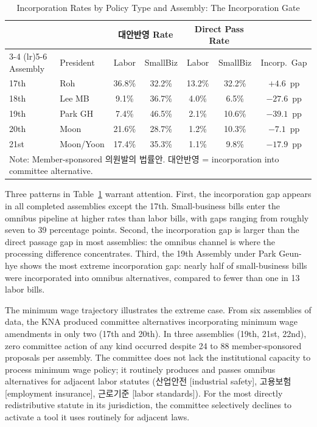 \documentclass[11pt]{article}
\begin{document}
\begin{table}[H]
\centering
\caption{Incorporation Rates by Policy Type and Assembly: The Incorporation Gate}
\label{tab:incorp}
\begin{tabular}{llccccc}
\toprule
 & & \multicolumn{2}{c}{대안반영 Rate} & \multicolumn{2}{c}{Direct Pass Rate} & \\
\cmidrule(lr){3-4} \cmidrule(lr){5-6}
Assembly & President & Labor & SmallBiz & Labor & SmallBiz & Incorp.\ Gap \\
\midrule
17th & Roh             & 36.8\% & 32.2\% & 13.2\% & 32.2\% & $+4.6$~pp \\
18th & Lee MB          & 9.1\%  & 36.7\% & 4.0\%  & 6.5\%  & $-27.6$~pp \\
19th & Park GH         & 7.4\%  & 46.5\% & 2.1\%  & 10.6\% & $-39.1$~pp \\
20th & Moon            & 21.6\% & 28.7\% & 1.2\%  & 10.3\% & $-7.1$~pp \\
21st & Moon/Yoon       & 17.4\% & 35.3\% & 1.1\%  & 9.8\%  & $-17.9$~pp \\
\bottomrule
\multicolumn{7}{l}{\footnotesize Note: Member-sponsored 의원발의 법률안. 대안반영 = incorporation into committee alternative.} \\
\end{tabular}
\end{table}

Three patterns in Table~\ref{tab:incorp} warrant attention. First, the incorporation gap appears in all completed assemblies except the 17th. Small-business bills enter the omnibus pipeline at higher rates than labor bills, with gaps ranging from roughly seven to 39 percentage points. Second, the incorporation gap is larger than the direct passage gap in most assemblies: the omnibus channel is where the processing difference concentrates. Third, the 19th Assembly under Park Geun-hye shows the most extreme incorporation gap: nearly half of small-business bills were incorporated into omnibus alternatives, compared to fewer than one in 13 labor bills.

The minimum wage trajectory illustrates the extreme case. From six assemblies of data, the KNA produced committee alternatives incorporating minimum wage amendments in only two (17th and 20th). In three assemblies (19th, 21st, 22nd), zero committee action of any kind occurred despite 24 to 88 member-sponsored proposals per assembly. The committee does not lack the institutional capacity to process minimum wage policy; it routinely produces and passes omnibus alternatives for adjacent labor statutes (산업안전 [industrial safety], 고용보험 [employment insurance], 근로기준 [labor standards]). For the most directly redistributive statute in its jurisdiction, the committee selectively declines to activate a tool it uses routinely for adjacent laws.
\end{document}
